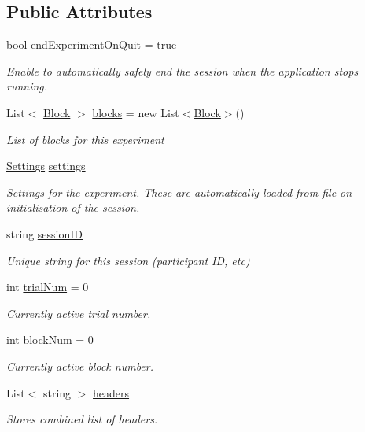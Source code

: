 \subsection*{Public Attributes}
\begin{DoxyCompactItemize}
\item 
bool \hyperlink{class_exp_mngr_1_1_experiment_session_a12aa1573a93de7e4eb67630c77f03dd5}{end\+Experiment\+On\+Quit} = true
\begin{DoxyCompactList}\small\item\em Enable to automatically safely end the session when the application stops running. \end{DoxyCompactList}\item 
List$<$ \hyperlink{class_exp_mngr_1_1_block}{Block} $>$ \hyperlink{class_exp_mngr_1_1_experiment_session_af2658ee7bda97d6dba5414d7569347de}{blocks} = new List$<$\hyperlink{class_exp_mngr_1_1_block}{Block}$>$()
\begin{DoxyCompactList}\small\item\em List of blocks for this experiment \end{DoxyCompactList}\item 
\hyperlink{class_exp_mngr_1_1_settings}{Settings} \hyperlink{class_exp_mngr_1_1_experiment_session_a93888535df3ee8dc4099fdc47d729d9c}{settings}
\begin{DoxyCompactList}\small\item\em \hyperlink{class_exp_mngr_1_1_settings}{Settings} for the experiment. These are automatically loaded from file on initialisation of the session. \end{DoxyCompactList}\item 
string \hyperlink{class_exp_mngr_1_1_experiment_session_af7496db421f1d8719c0be1a93a69ae83}{session\+ID}
\begin{DoxyCompactList}\small\item\em Unique string for this session (participant ID, etc) \end{DoxyCompactList}\item 
int \hyperlink{class_exp_mngr_1_1_experiment_session_aee300524bfc6b29f052f2f1109c9c9ac}{trial\+Num} = 0
\begin{DoxyCompactList}\small\item\em Currently active trial number. \end{DoxyCompactList}\item 
int \hyperlink{class_exp_mngr_1_1_experiment_session_a4a4701a6251bf43643e48af5a87973b2}{block\+Num} = 0
\begin{DoxyCompactList}\small\item\em Currently active block number. \end{DoxyCompactList}\item 
List$<$ string $>$ \hyperlink{class_exp_mngr_1_1_experiment_session_a828dd54e48d385da1064078ad68fdc82}{headers}
\begin{DoxyCompactList}\small\item\em Stores combined list of headers. \end{DoxyCompactList}\end{DoxyCompactItemize}
